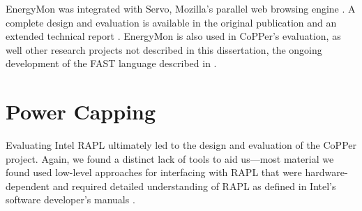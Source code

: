 EnergyMon was integrated with Servo, Mozilla's parallel web browsing engine \cite{servo}.
A complete design and evaluation is available in the original publication \cite{energymon} and an extended technical report \cite{EnergyMonTR}.
EnergyMon is also used in CoPPer's evaluation, as well other research projects not described in this dissertation, \eg the ongoing development of the FAST language described in .


\section{Power Capping}
\label{app:powercap}

Evaluating Intel RAPL \cite{RAPL} ultimately led to the design and evaluation of the CoPPer project.
Again, we found a distinct lack of tools to aid us---most material we found used low-level approaches for interfacing with RAPL that were hardware-dependent and required detailed understanding of RAPL as defined in Intel's software developer's manuals \cite{intel-sdm}.

